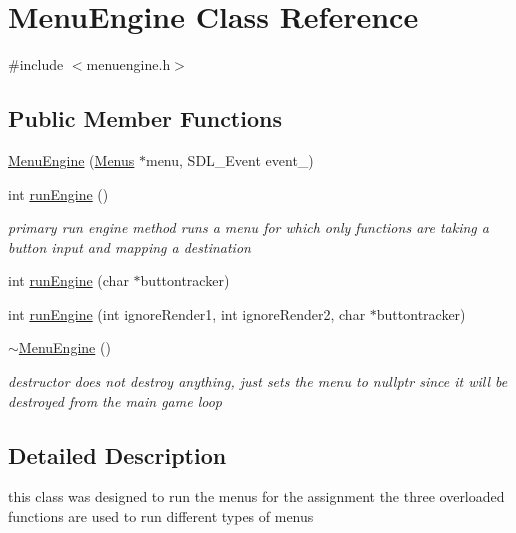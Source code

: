 \hypertarget{class_menu_engine}{}\section{Menu\+Engine Class Reference}
\label{class_menu_engine}


{\ttfamily \#include $<$menuengine.\+h$>$}

\subsection*{Public Member Functions}
\begin{DoxyCompactItemize}
\item 
\hyperlink{class_menu_engine_a73e9b1c7c061c19862853069466c5f28}{Menu\+Engine} (\hyperlink{class_menus}{Menus} $\ast$menu, S\+D\+L\+\_\+\+Event event\+\_\+)
\item 
\hypertarget{class_menu_engine_a1e08c450b6d65f1259f43247d40aab7c}{}\label{class_menu_engine_a1e08c450b6d65f1259f43247d40aab7c} 
int \hyperlink{class_menu_engine_a1e08c450b6d65f1259f43247d40aab7c}{run\+Engine} ()
\begin{DoxyCompactList}\small\item\em primary run engine method runs a menu for which only functions are taking a button input and mapping a destination \end{DoxyCompactList}\item 
int \hyperlink{class_menu_engine_a3451ff9a6fd653ac8c14bdb243fb4dbd}{run\+Engine} (char $\ast$buttontracker)
\item 
int \hyperlink{class_menu_engine_a3892d4815765b63648789bcfe28ca729}{run\+Engine} (int ignore\+Render1, int ignore\+Render2, char $\ast$buttontracker)
\item 
\hypertarget{class_menu_engine_abf59152c4258e0199e89fab2979fb09e}{}\label{class_menu_engine_abf59152c4258e0199e89fab2979fb09e} 
\hyperlink{class_menu_engine_abf59152c4258e0199e89fab2979fb09e}{$\sim$\+Menu\+Engine} ()
\begin{DoxyCompactList}\small\item\em destructor does not destroy anything, just sets the menu to nullptr since it will be destroyed from the main game loop \end{DoxyCompactList}\end{DoxyCompactItemize}


\subsection{Detailed Description}
this class was designed to run the menus for the assignment the three overloaded functions are used to run different types of menus 

